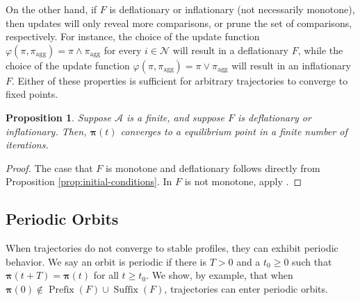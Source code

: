 \documentclass[conference]{ieeeconf}
\newcommand{\N}{\mathcal{N}}
\newcommand{\A}{\mathcal{A}}
\newcommand{\profile}{\boldsymbol{\pi}}
\newcommand{\join}{\vee}
\newcommand{\meet}{\wedge}
\renewcommand{\geq}{\geqslant}
\DeclareMathOperator{\Pre}{Prefix}
\DeclareMathOperator{\Post}{Suffix}
\newtheorem{proposition}{Proposition}
\begin{document}
On the other hand, if $F$ is deflationary or inflationary (not necessarily monotone), then updates will only reveal more comparisons, or prune the set of comparisons, respectively. For instance, the choice of the update function $\varphi(\pi,\pi_{\text{agg}}) = \pi \meet \pi_{\text{agg}}$ for every $i \in \N$ will result in a deflationary $F$, while the choice of the update function 
$\varphi(\pi,\pi_{\text{agg}}) = \pi \join \pi_{\text{agg}}$ will result in an inflationary $F$. Either of these properties is sufficient for arbitrary trajectories to converge to fixed points.

\begin{proposition} \label{prop:inflationary}
     Suppose $\A$ is a finite, and suppose $F$ is deflationary or inflationary. Then, $\profile(t)$ converges to a equilibrium point in a finite number of iterations.
\end{proposition}
\begin{proof}
    The case that $F$ is monotone and deflationary follows directly from Proposition \ref{prop:initial-conditions}. In $F$ is not monotone, apply \cite[Theorem 12.19]{roman2008}.
\end{proof}

\subsection{Periodic Orbits}
When trajectories do not converge to stable profiles, they can exhibit periodic behavior. We say an orbit is periodic if there is $T>0$ and a $t_0 \geq 0$ such that $\profile(t+T) = \profile(t)$ for all $t \geq t_0$. We show, by example, that when $\profile(0) \notin \Pre(F) \cup \Post(F)$, trajectories can enter periodic orbits.
\end{document}
